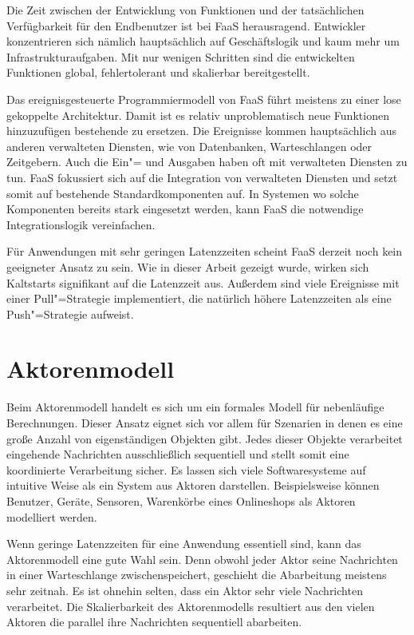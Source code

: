 Die Zeit zwischen der Entwicklung von Funktionen und der tatsächlichen Verfügbarkeit für den Endbenutzer ist bei FaaS herausragend. Entwickler konzentrieren sich nämlich hauptsächlich auf Geschäftslogik und kaum mehr um Infrastrukturaufgaben. Mit nur wenigen Schritten sind die entwickelten Funktionen global, fehlertolerant und skalierbar bereitgestellt.

Das ereignisgesteuerte Programmiermodell von FaaS führt meistens zu einer lose gekoppelte Architektur. Damit ist es relativ unproblematisch neue Funktionen hinzuzufügen \bzw bestehende zu ersetzen. Die Ereignisse kommen hauptsächlich aus anderen verwalteten Diensten, wie \zB von Datenbanken, Warteschlangen oder Zeitgebern. Auch die Ein"= und Ausgaben haben oft mit verwalteten Diensten zu tun. \Dah FaaS fokussiert sich auf die Integration von verwalteten Diensten und setzt somit auf bestehende Standardkomponenten auf. In Systemen wo solche Komponenten bereits stark eingesetzt werden, kann FaaS die notwendige Integrationslogik vereinfachen.

Für Anwendungen mit sehr geringen Latenzzeiten scheint FaaS derzeit noch kein geeigneter Ansatz zu sein. Wie in dieser Arbeit gezeigt wurde, wirken sich Kaltstarts signifikant auf die Latenzzeit aus. Außerdem sind viele Ereignisse mit einer Pull"=Strategie implementiert, die natürlich höhere Latenzzeiten als eine Push"=Strategie aufweist.

\section{Aktorenmodell}

Beim Aktorenmodell handelt es sich um ein formales Modell für nebenläufige Berechnungen. Dieser Ansatz eignet sich vor allem für Szenarien in denen es eine große Anzahl von eigenständigen Objekten gibt. Jedes dieser Objekte verarbeitet eingehende Nachrichten ausschließlich sequentiell und stellt somit eine koordinierte Verarbeitung sicher. Es lassen sich viele Softwaresysteme auf intuitive Weise als ein System aus Aktoren darstellen. Beispielsweise können Benutzer, Geräte, Sensoren, Warenkörbe eines Onlineshops \usw als Aktoren modelliert werden.

Wenn geringe Latenzzeiten für eine Anwendung essentiell sind, kann das Aktorenmodell eine gute Wahl sein. Denn obwohl jeder Aktor seine Nachrichten in einer Warteschlange zwischenspeichert, geschieht die Abarbeitung meistens sehr zeitnah. Es ist ohnehin selten, dass ein Aktor sehr viele Nachrichten verarbeitet. Die Skalierbarkeit des Aktorenmodells resultiert aus den vielen Aktoren die parallel ihre Nachrichten sequentiell abarbeiten.

